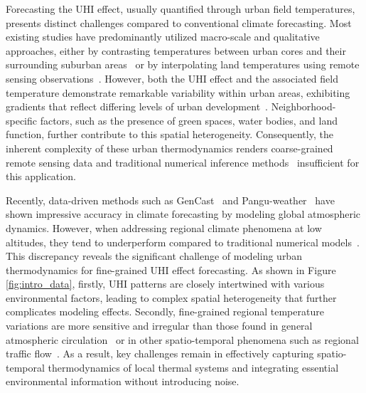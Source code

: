 Forecasting the UHI effect, usually quantified through urban field temperatures, presents distinct challenges compared to conventional climate forecasting. Most existing studies have predominantly utilized macro-scale and qualitative approaches, either by contrasting temperatures between urban cores and their surrounding suburban areas~\cite{rizwan2008review,yang2016research,tehrani2024predicting} or by interpolating land temperatures using remote sensing observations~\cite{mirzaei2010approaches,peng2012surface,diem2024remote,zhou2018satellite}. However, both the UHI effect and the associated field temperature demonstrate remarkable variability within urban areas, exhibiting gradients that reflect differing levels of urban development~\cite{lyu2022integrated,yoo2018investigating}. Neighborhood-specific factors, such as the presence of green spaces, water bodies, and land function, further contribute to this spatial heterogeneity. Consequently, the inherent complexity of these urban thermodynamics renders coarse-grained remote sensing data and traditional numerical inference methods~\cite{adilkhanova2022recent,yang2022quantitative} insufficient for this application.

Recently, data-driven methods such as GenCast~\cite{price2025probabilistic} and Pangu-weather~\cite{bi2022pangu,xu2024improvement} have shown impressive accuracy in climate forecasting by modeling global atmospheric dynamics. However, when addressing regional climate phenomena at low altitudes, they tend to underperform compared to traditional numerical models~\cite{olivetti2024data,huang2025initial}. This discrepancy reveals the significant challenge of modeling urban thermodynamics for fine-grained UHI effect forecasting. As shown in Figure \ref{fig:intro_data}, firstly, UHI patterns are closely intertwined with various environmental factors, leading to complex spatial heterogeneity that further complicates modeling effects. Secondly, fine-grained regional temperature variations are more sensitive and irregular than those found in general atmospheric circulation~\cite{price2023gencast,nguyen2023scaling} or in other spatio-temporal phenomena such as regional traffic flow~\cite{liang2023airformer,yin2021deep,li2023dynamic}.  As a result, key challenges remain in effectively capturing spatio-temporal thermodynamics of local thermal systems and integrating essential environmental information without introducing noise.


